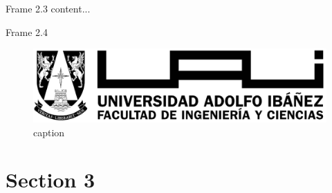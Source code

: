 \documentclass[xcolor=svgnames]{beamer}
\begin{document}
\begin{frame}{Frame 2.3}
	content...
\end{frame}

\begin{frame}{Frame 2.4}
	\begin{figure}[h]
	\centering
	\caption{caption}
	\includegraphics[width=.3\linewidth]{uai_fic_logo}
	\end{figure}
\end{frame}

\section{Section 3}

\lastrealframe

\section{}
\usebackgroundtemplate{}
\begin{frame}[plain]
	\titlepage
\end{frame}
\end{document}

